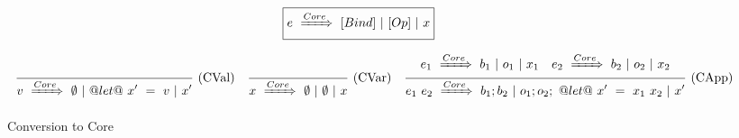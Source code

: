 
\begin{figure*}

$$
\boxed{\CoreComp{e}{[Bind]}{[Op]}{x}}
$$

$$
\ruleAx
{
    \CoreComp{v}{\emptyset}{@let@~x'~=~v}{x'}
}{CVal}
\ruleAx
{
    \CoreComp{x}{\emptyset}{\emptyset}{x}
}{CVar}
\ruleIN
{
    \CoreComp{e_1}{b_1}{o_1}{x_1}
    \quad
    \CoreComp{e_2}{b_2}{o_2}{x_2}
}{
    \CoreComp{e_1~e_2}{b_1;b_2}{o_1;o_2;~@let@~x'~=~x_1~x_2}{x'}
}{CApp}
$$


\caption{Conversion to Core}
\label{fig:core:compile}
\end{figure*}



